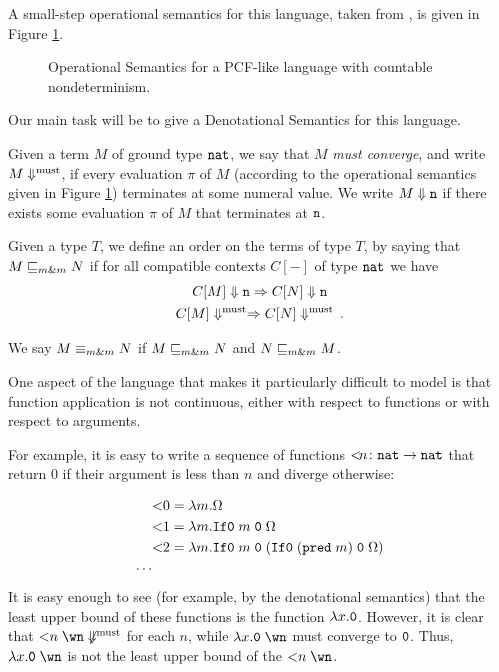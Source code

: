 \documentclass[sigplan,10pt,review]{acmart}\settopmatter{printfolios=true,printccs=false,printacmref=false}
\begin{document}
A small-step operational semantics for this language, taken from \cite{LairdOrdinalGames}, is given in Figure \ref{fig:op-sem}.
\begin{figure}
  \caption{Operational Semantics for a PCF-like language with countable nondeterminism.}
  \label{fig:op-sem}
\end{figure}
Our main task will be to give a Denotational Semantics for this language.

Given a term $M$ of ground type ${\mathtt{nat}}$, we say that $M$ \emph{must converge}, and write $M\Downarrow^{\text{must}}$, if every evaluation $\pi$ of $M$ (according to the operational semantics given in Figure \ref{fig:op-sem}) terminates at some numeral value.  
We write $M \Downarrow {\mathtt{n}}$ if there exists some evaluation $\pi$ of $M$ that terminates at ${\mathtt{n}}$.  

Given a type $T$, we define an order on the terms of type $T$, by saying that $M\sqsubseteq_{m\&m} N$ if for all compatible contexts $C[-]$ of type ${\mathtt{nat}}$ we have
\begin{gather*}
  C[M]\Downarrow{\mathtt{n}}\Rightarrow C[N]\Downarrow {\mathtt{n}} \\
  C[M]\Downarrow^{\text{must}}\Rightarrow C[N]\Downarrow^{\text{must}}\,.
\end{gather*}

We say $M\equiv_{m\&m} N$ if $M\sqsubseteq_{m\&m} N$ and $N\sqsubseteq_{m\&m} M$.

One aspect of the language that makes it particularly difficult to model is that function application is not continuous, either with respect to functions or with respect to arguments.  

For example, it is easy to write a sequence of functions ${<}\!n \colon {\mathtt{nat}} \to {\mathtt{nat}}$ that return $0$ if their argument is less than $n$ and diverge otherwise:

\begin{align*}
  &{<}0 = \lambda m.\Omega \\
  &{<}1 = \lambda m.{\mathtt{If0}\;} m\;{\mathtt{0}}\;\Omega \\
  &{<}2 = \lambda m.{\mathtt{If0}\;} m\;{\mathtt{0}}\;({\mathtt{If0}\;} ({\mathtt{pred\;}} m)\;{\mathtt{0}}\;\Omega)\\
  \cdots
\end{align*}
It is easy enough to see (for example, by the denotational semantics) that the least upper bound of these functions is the function $\lambda x.{\mathtt{0}}$.  
However, it is clear that ${<}n\;\wn\not\mustconverge$ for each $n$, while $\lambda x.\0\;\wn$ must converge to ${\mathtt{0}}$.  
Thus, $\lambda x.\0\;\wn$ is not the least upper bound of the ${<}n\;\wn$.
\end{document}
